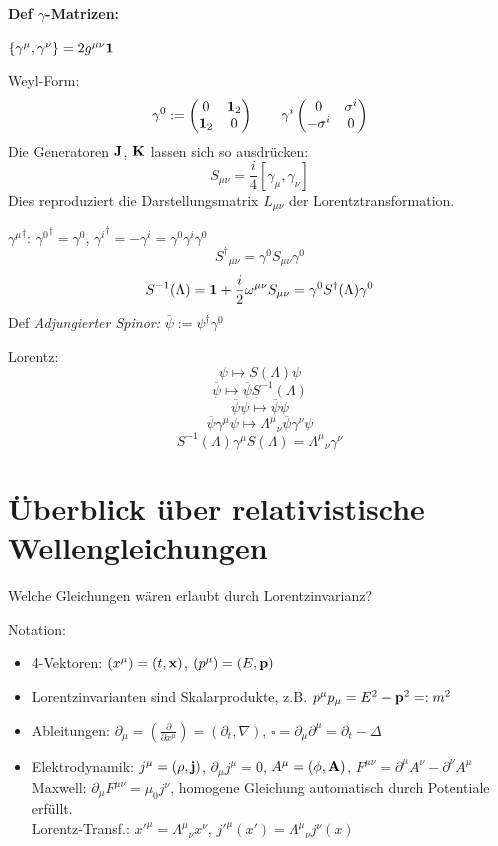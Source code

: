 \documentclass[11pt,a4paper]{report}
\begin{document}
\paragraph{Def $\gamma$-Matrizen:} $\{\gamma^\mu ,\gamma^\nu\}=2g^{\mu\nu}\mathbf{1}$\par 

Weyl-Form:
$$\gamma^0 :=\begin{pmatrix}
0 & \mathbf{1}_2 \\ \mathbf{1}_2 & 0 
\end{pmatrix}\qquad\gamma^i \begin{pmatrix}
0 & \sigma^i \\ -\sigma^i & 0
\end{pmatrix}$$
Die Generatoren $\mathbf{J}$, $\mathbf{K}$ lassen sich so ausdrücken:
$$S_{\mu\nu}=\frac{i}{4}[\gamma_\mu,\gamma_\nu]$$
Dies reproduziert die Darstellungsmatrix $L_{\mu\nu}$ der Lorentztransformation.\par 

${\gamma^\mu}^\dagger$: ${\gamma^0}^\dagger = \gamma^0$, ${\gamma^i}^\dagger = -\gamma^i = \gamma^0\gamma^i\gamma^0$
$${S^\dagger}_{\mu\nu} = \gamma^0 S_{\mu\nu} \gamma^0$$
$$S^{-1}(\Lambda )=\mathbf{1}+\frac{i}{2}\omega^{\mu\nu}S_{\mu\nu}=\gamma^0 S^\dagger (\Lambda )\gamma^0$$
Def \textit{Adjungierter Spinor:} $\overline{\psi}:=\psi^\dagger\gamma^0$\par 
Lorentz:
$$\psi\longmapsto S(\Lambda )\psi$$
$$\overline{\psi}\longmapsto \overline{\psi}S^{-1}(\Lambda )$$
$$\overline{\psi}\psi\longmapsto\overline{\psi}\psi$$
$$\overline{\psi}\gamma^\mu\psi\longmapsto {\Lambda^\mu}_\nu\overline{\psi}\gamma^\nu\psi$$
$$S^{-1}(\Lambda )\gamma^\mu S(\Lambda )={\Lambda^\mu}_\nu\gamma^\nu$$

\section{Überblick über relativistische Wellengleichungen}

Welche Gleichungen wären erlaubt durch Lorentzinvarianz?\par 

Notation: \par 
\begin{itemize}
\item 4-Vektoren: $(x^\mu )=(t,\mathbf{x})$, $(p^\mu)=(E,\mathbf{p})$
\item Lorentzinvarianten sind Skalarprodukte, z.B. $p^\mu p_\mu = E^2-\mathbf{p}^2=:m^2$
\item Ableitungen: $\partial_\mu = \left(\frac{\partial}{\partial x^\mu}\right) = (\partial_t,\nabla )$, $\square = \partial_\mu\partial^\mu = \partial_t -\Delta$
\item Elektrodynamik: $j^\mu = (\rho ,\mathbf{j})$, $\partial_\mu j^\mu = 0$, $A^\mu = (\phi, \mathbf{A})$, $F^{\mu\nu}=\partial^\mu A^\nu -\partial^\nu A^\mu$\\
Maxwell: $\partial_\mu F^{\mu\nu} = \mu_0 j^\nu$, homogene Gleichung automatisch durch Potentiale erfüllt.\\
Lorentz-Transf.: $x'^\mu ={\Lambda^\mu}_\nu x^\nu$, $j'^\mu (x')={\Lambda^\mu}_\nu j^\nu (x)$
\end{itemize}
\end{document}
